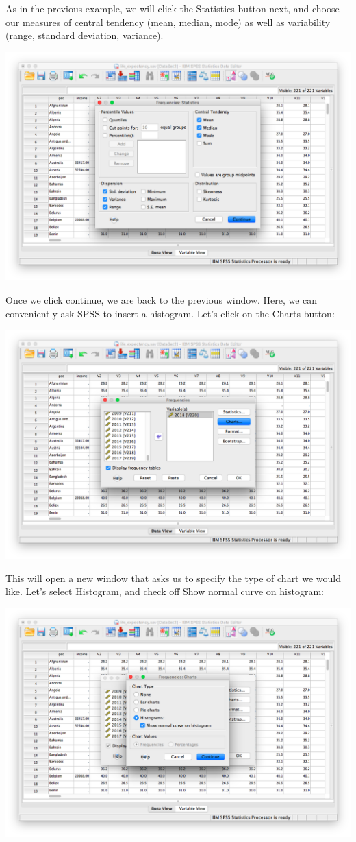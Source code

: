 \documentclass[
]{book}
\begin{document}
As in the previous example, we will click the {Statistics} button next, and choose our measures of central tendency {(mean, median, mode)} as well as variability {(range, standard deviation, variance)}.

\includegraphics{img/2.4.18.png}

Once we click continue, we are back to the previous window. Here, we can conveniently ask SPSS to insert a histogram. Let's click on the {Charts} button:

\includegraphics{img/2.4.19.png}

This will open a new window that asks us to specify the type of chart we would like. Let's select {Histogram}, and check off {Show normal curve on histogram}:

\includegraphics{img/2.4.20.png}
\end{document}
